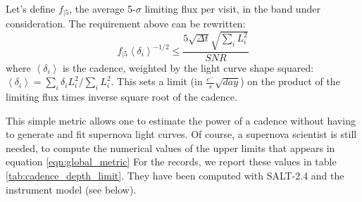 \documentclass[\docopts]{\docclass}
\begin{document}
Let's define $f_{|5}$, the average 5-$\sigma$ limiting flux per visit,
in the band under consideration. The requirement above can be
rewritten:
\begin{equation}
  f_{|5} \left<\delta_i\right>^{-1/2} \leq \frac{5 \sqrt{\Delta t} \sqrt{\sum_i L_i^2}}{SNR}
  \label{eqn:global_metric}
\end{equation}
where $\left<\delta_i\right>$ is the cadence, weighted by the light
curve shape squared: $\left<\delta_i\right> = \sum_i \delta_i
L_i^2/\sum_i L_i^2$.  This sets a limit (in $\frac{e^-}{s}
\sqrt{day}$) on the product of the limiting flux times inverse square
root of the cadence.

This simple metric allows one to estimate the power of a cadence
without having to generate and fit supernova light curves.  Of course,
a supernova scientist is still needed, to compute the numerical values
of the upper limits that appears in equation \ref{eqn:global_metric}
For the records, we report these values in table
\ref{tab:cadence_depth_limit}. They have been computed with SALT-2.4
and the  instrument model (see below).
\end{document}
